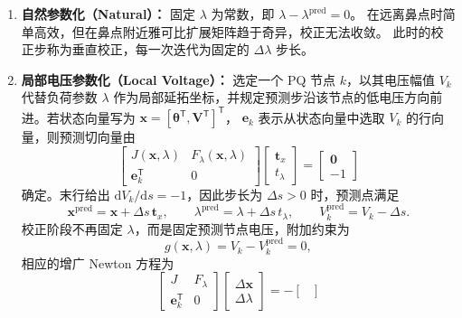 \begin{enumerate}
  \item \textbf{自然参数化（Natural）：}
  固定 $\lambda$ 为常数，即 $\lambda-\lambda^{\text{pred}}=0$。
  在远离鼻点时简单高效，但在鼻点附近雅可比扩展矩阵趋于奇异，校正无法收敛。
  此时的校正步称为垂直校正，每一次迭代为固定的 $\Delta \lambda$ 步长。

  \item \textbf{局部电压参数化（Local Voltage）：}
  选定一个 PQ 节点 $k$，以其电压幅值 $V_k$ 代替负荷参数 $\lambda$
  作为局部延拓坐标，并规定预测步沿该节点的低电压方向前进。若状态向量写为
  $\bm{x}=[\bm{\theta}^{\mathsf T},\bm{V}^{\mathsf T}]^{\mathsf T}$，
  $\bm{e}_k$ 表示从状态向量中选取 $V_k$ 的行向量，则预测切向量由
  \begin{equation}
    \begin{bmatrix}
      J(\bm{x},\lambda) & F_\lambda(\bm{x},\lambda) \\
      \bm{e}_k^{\mathsf T} & 0
    \end{bmatrix}
    \begin{bmatrix}
      \bm{t}_x \\ t_\lambda
    \end{bmatrix}
    =
    \begin{bmatrix}
      \bm{0} \\ -1
    \end{bmatrix}
  \end{equation}
  确定。末行给出 $\mathrm{d}V_k/\mathrm{d}s=-1$，因此步长为
  $\Delta s>0$ 时，预测点满足
  \begin{equation}
    \bm{x}^{\mathrm{pred}}=\bm{x}+\Delta s\,\bm{t}_x,
    \qquad
    \lambda^{\mathrm{pred}}=\lambda+\Delta s\,t_\lambda,
    \qquad
    V_k^{\mathrm{pred}}=V_k-\Delta s.
  \end{equation}
  校正阶段不再固定 $\lambda$，而是固定预测节点电压，附加约束为
  \begin{equation}
    g(\bm{x},\lambda)=V_k-V_k^{\mathrm{pred}}=0,
  \end{equation}
  相应的增广 Newton 方程为
  \begin{equation}
    \begin{bmatrix}
      J & F_\lambda \\
      \bm{e}_k^{\mathsf T} & 0
    \end{bmatrix}
    \begin{bmatrix}
      \Delta\bm{x} \\ \Delta\lambda
    \end{bmatrix}
    =-
    \begin{bmatrix}

\end{bmatrix}
\end{equation}
\end{enumerate}
